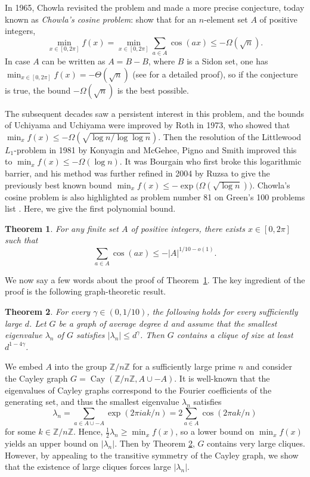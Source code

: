 \documentclass[11pt]{article}
\theoremstyle{plain}
\newtheorem{theorem}{Theorem}[section]
\theoremstyle{definition}
\DeclareMathOperator{\Cay}{Cay}
\begin{document}
In 1965, Chowla \cite{C65} revisited the problem and made a more precise conjecture, today known as \textit{Chowla's cosine problem}: show that for an $n$-element set $A$ of positive integers,
$$\min_{x\in [0, 2\pi]} f(x)=\min_{x\in [0, 2\pi]} \sum_{a\in A}\cos(a x) \leq -\Omega(\sqrt{n}).$$ In case $A$ can be written as $A=B-B$, where $B$ is a Sidon set, one has $\min_{x\in [0, 2\pi]} f(x)=-\Theta(\sqrt{n})$ (see \cite{M19} for a detailed proof), so if the conjecture is true, the bound $-\Omega(\sqrt{n})$ is the best possible. 

The subsequent decades saw a persistent interest in this problem, and the bounds of Uchiyama and Uchiyama were improved by Roth \cite{R73} in 1973, who showed that $\min_{x} f(x)\leq -\Omega(\sqrt{\log n/\log\log n})$. Then the resolution of the Littlewood $L_1$-problem in 1981 by Konyagin \cite{K81} and McGehee, Pigno and Smith \cite{MPS81} improved this to $\min_{x}f(x)\leq -\Omega(\log n)$. It was Bourgain \cite{B86} who first broke this logarithmic barrier, and his method was further refined in 2004 by Ruzsa \cite{R04} to give the previously best known bound $\min_x f(x)\leq -\exp\big(\Omega(\sqrt{\log n})\big)$. Chowla's cosine problem is also highlighted as problem number 81 on Green's 100 problems list \cite{green}. Here, we give the first polynomial bound.

\begin{theorem}\label{thm:MAIN_CHOWLA}
For any finite set $A$ of positive integers, there exists $x\in [0,2\pi]$ such that 
$$\sum_{a\in A}\cos(ax)\leq -|A|^{1/10-o(1)}.$$
\end{theorem}

 We now say a few words about the proof of Theorem~\ref{thm:MAIN_CHOWLA}. The key ingredient of the proof is the following graph-theoretic result.

\begin{theorem}\label{thm:MAIN_SE3}
For every $\gamma\in (0,1/10)$, the following holds for every sufficiently large $d$. Let $G$ be a graph of average degree $d$ and assume that the smallest eigenvalue $\lambda_n$ of $G$ satisfies $|\lambda_n|\leq d^{\gamma}$. Then $G$ contains a clique of size at least $d^{1-4\gamma}$.
\end{theorem}

We embed $A$ into the group $\mathbb{Z}/n\mathbb{Z}$ for a sufficiently large prime $n$ and consider the Cayley graph $G=\Cay(\mathbb{Z}/n\mathbb{Z}, A\cup -A)$. It is well-known that the eigenvalues of Cayley graphs correspond to the Fourier coefficients of the generating set, and thus the smallest eigenvalue $\lambda_n$ satisfies 
$$\lambda_n=\sum_{a\in A\cup -A}\exp(2\pi i ak/n)=2\sum_{a\in A}\cos(2\pi a k/n)$$ for some $k\in \mathbb{Z}/n\mathbb{Z}$. Hence, $\frac{1}{2}\lambda_n\geq \min_x f(x)$, so a lower bound on $\min_x f(x)$ yields an upper bound on $|\lambda_n|$. Then by Theorem \ref{thm:MAIN_SE3}, $G$ contains very large cliques. However, by appealing to the transitive symmetry of the Cayley graph, we show that the existence of large cliques forces large $|\lambda_n|$.
\end{document}
